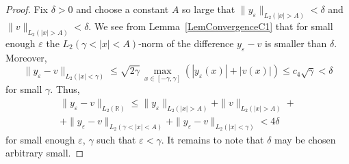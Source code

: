 \documentclass[11pt,english]{amsart}
\begin{document}
\begin{proof}
Fix $\delta>0$ and choose a constant $A$ so large that  $\|y_\varepsilon\|_{L_2(|x|>A)}<\delta$ and $\|v\|_{L_2(|x|>A)}<\delta$.
We see from Lemma~\ref{LemConvergenceC1} that for small enough $\varepsilon$ the $L_2(\gamma<|x|<A)$-norm
of the difference $y_\varepsilon-v$ is smaller than $\delta$.
Moreover,
\begin{equation*}
    \|y_\varepsilon-v\|_{L_2(|x|<\gamma)}\leq \sqrt{2\gamma}\,\max_{x\in [-\gamma,\gamma] }\left(|y_\varepsilon(x)|+|v(x)|\right)\leq c_4\sqrt{\gamma}<\delta
\end{equation*}
for small $\gamma$.
Thus,
\begin{multline*}
   \|y_\varepsilon-v\|_{L_2(\mathbb{R})}\leq  \|y_\varepsilon\|_{L_2(|x|>A)}+\|v\|_{L_2(|x|>A)}+\\+\|y_\varepsilon-v\|_{L_2(\gamma<|x|<A)}
   + \|y_\varepsilon-v\|_{L_2(|x|<\gamma)}< 4\delta
\end{multline*}
for small enough $\varepsilon$, $\gamma$ such that $\varepsilon<\gamma$.
It remains to note that $\delta$ may be chosen arbitrary small.
\end{proof}
\end{document}

